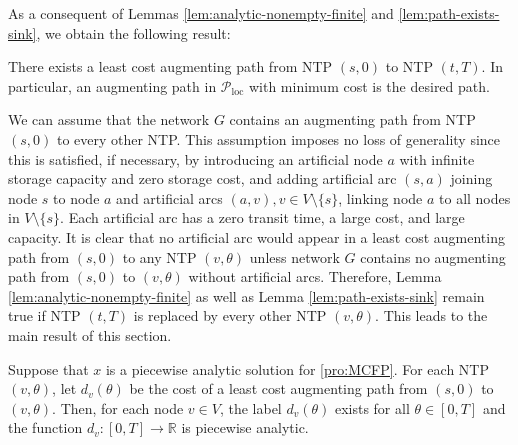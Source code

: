 \documentclass{svjour3}                     \smartqed
\newcommand{\rr}{\ensuremath{\mathbb{R}}}
\newcommand{\loc}{\ensuremath{\text{loc}}}
\begin{document}
As a consequent of Lemmas \ref{lem:analytic-nonempty-finite} and \ref{lem:path-exists-sink}, we obtain the following result:
\begin{theorem}
\label{thm:CDSP-existence}
There exists a least cost augmenting path from NTP $(s,0)$ to NTP $(t,T)$. In particular, an augmenting path in $\mathcal{P}_{\loc}$ with minimum cost is the desired path.
\end{theorem}


We can assume that the network $G$ contains an augmenting path from NTP $(s,0)$ to every other NTP. This assumption imposes no loss of generality since this is satisfied, if necessary, by introducing an artificial  node $a$ with infinite storage capacity and zero storage cost, and adding artificial arc $(s,a)$ joining node $s$ to node $a$ and artificial arcs $(a,v), v\in V\setminus\{s\}$, linking node $a$ to all nodes in $V\setminus\{s\}$. Each artificial arc has a zero transit time, a large cost, and large capacity. It is clear that no artificial arc would appear in a least cost augmenting path from $(s,0)$ to any NTP $(v,\theta)$ unless network $G$ contains no augmenting path from $(s,0)$ to $(v,\theta)$ without artificial arcs. Therefore, Lemma \ref{lem:analytic-nonempty-finite} as well as Lemma \ref{lem:path-exists-sink} remain true if NTP $(t,T)$ is replaced by every other NTP $(v,\theta)$. This leads to the main result of this section.



\begin{theorem}
\label{thm:CDSP-analytic}
Suppose that $x$ is a piecewise analytic solution for \eqref{pro:MCFP}. For each NTP $(v,\theta)$, let $d_v(\theta)$ be the cost of a least cost augmenting path from $(s,0)$ to $(v,\theta)$. Then, for each node $v\in V$, the label $d_v(\theta)$ exists for all $\theta\in [0,T]$ and the function $d_v:[0,T]\rightarrow \rr$ is piecewise analytic.
\end{theorem}
\end{document}
